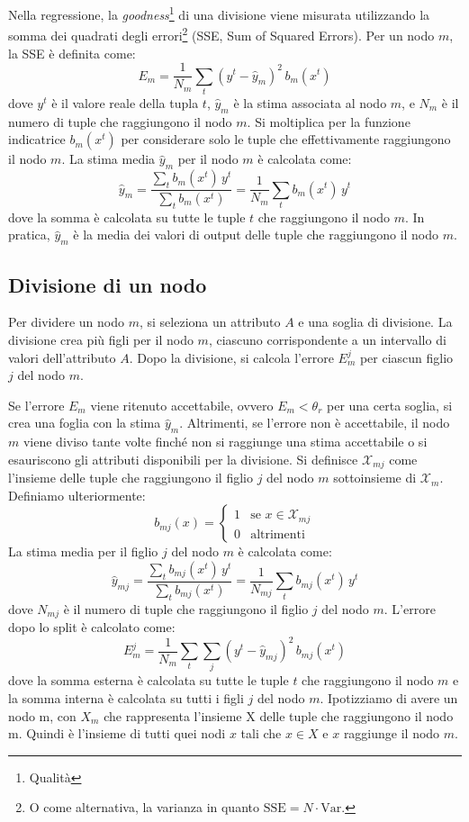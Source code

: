 Nella regressione, la \emph{goodness}\footnote{Qualità} di una divisione viene misurata utilizzando la somma dei quadrati degli errori\footnote{O come alternativa, la varianza in quanto $\text{SSE} = N \cdot \text{Var}$.} (SSE, Sum of Squared Errors). Per un nodo $m$, la SSE è definita come:
\[
E_m = \frac{1}{N_m} \sum_{t} (y^t - \hat{y}_m)^2 \, b_m(x^t)
\]
dove $y^t$ è il valore reale della tupla $t$, $\hat{y}_m$ è la stima associata al nodo $m$, e $N_m$ è il numero di tuple che raggiungono il nodo $m$. Si moltiplica per la funzione indicatrice $b_m(x^t)$ per considerare solo le tuple che effettivamente raggiungono il nodo $m$. La stima media $\hat{y}_m$ per il nodo $m$ è calcolata come:
\[
\hat{y}_m = \frac{\sum_{t} b_m(x^t)\, y^t}{\sum_{t} b_m(x^t)} = \frac{1}{N_m} \sum_{t} b_m(x^t)\, y^t
\]
dove la somma è calcolata su tutte le tuple $t$ che raggiungono il nodo $m$. In pratica, $\hat{y}_m$ è la media dei valori di output delle tuple che raggiungono il nodo $m$.

\subsection{Divisione di un nodo}
Per dividere un nodo $m$, si seleziona un attributo $A$ e una soglia di divisione. La divisione crea più figli per il nodo $m$, ciascuno corrispondente a un intervallo di valori dell'attributo $A$. Dopo la divisione, si calcola l'errore $E_m^j$ per ciascun figlio $j$ del nodo $m$. 

Se l'errore $E_m$ viene ritenuto accettabile, ovvero $E_m < \theta_r$ per una certa soglia, si crea una foglia con la stima $\hat{y}_m$. Altrimenti, se l'errore non è accettabile, il nodo $m$ viene diviso tante volte finché non si raggiunge una stima accettabile o si esauriscono gli attributi disponibili per la divisione. Si definisce $\mathcal{X}_{mj}$ come l'insieme delle tuple che raggiungono il figlio $j$ del nodo $m$ sottoinsieme di $\mathcal{X}_m$. Definiamo ulteriormente:
\[
b_{mj}(x) =
\begin{cases}
1 & \text{se } x \in \mathcal{X}_{mj} \\
0 & \text{altrimenti}
\end{cases}
\]
La stima media per il figlio $j$ del nodo $m$ è calcolata come:
\[
\hat{y}_{mj} = \frac{\sum_{t} b_{mj}(x^t)\, y^t}{\sum_{t} b_{mj}(x^t)} = \frac{1}{N_{mj}} \sum_{t} b_{mj}(x^t)\, y^t
\]
dove $N_{mj}$ è il numero di tuple che raggiungono il figlio $j$ del nodo $m$. L'errore dopo lo split è calcolato come:
\[
E^j_m = \frac{1}{N_m} \sum_{t} \sum_{j} (y^t - \hat{y}_{mj})^2 \, b_{mj}(x^t)
\]
dove la somma esterna è calcolata su tutte le tuple $t$ che raggiungono il nodo $m$ e la somma interna è calcolata su tutti i figli $j$ del nodo $m$. Ipotizziamo di avere un nodo m, con $X_m$ che rappresenta l'insieme X delle tuple che raggiungono il nodo m. Quindi è l'insieme di tutti quei nodi $x$ tali che $x \in X$ e $x$ raggiunge il nodo $m$.


